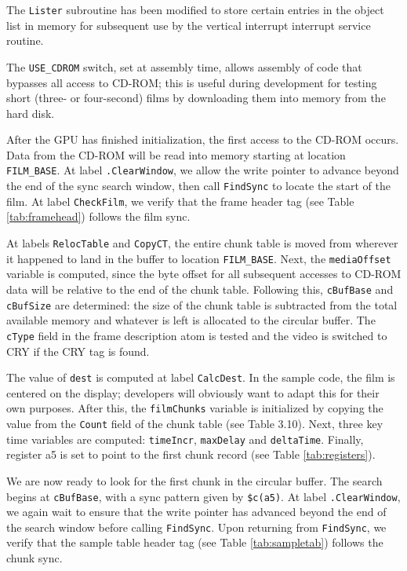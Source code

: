 \documentclass[12pt,letterpaper,twoside]{article}
\begin{document}
The \texttt{Lister} subroutine has been modified to store certain entries in the object list in memory for subsequent use by the vertical interrupt interrupt service routine.

The \texttt{USE\_CDROM} switch, set at assembly time, allows assembly of code that bypasses all access to CD-ROM; this is useful during development for testing short (three- or four-second) films by downloading them into memory from the hard disk.

After the GPU has finished initialization, the first access to the CD-ROM occurs. Data from the CD-ROM will be read into memory starting at location \texttt{FILM\_BASE}. At label \texttt{.ClearWindow}, we allow the write pointer to advance beyond the end of the sync search window, then call \texttt{FindSync} to locate the start of the film. At label \texttt{CheckFilm}, we verify that the frame header tag (see Table \ref{tab:framehead}) follows the film sync.

At labels \texttt{RelocTable} and \texttt{CopyCT}, the entire chunk table is moved from wherever it happened to land in the buffer to location \texttt{FILM\_BASE}. Next, the \texttt{mediaOffset} variable is computed, since the byte offset for all subsequent accesses to CD-ROM data will be relative to the end of the chunk table. Following this, \texttt{cBufBase} and \texttt{cBufSize} are determined: the size of the chunk table is subtracted from the total available memory and whatever is left is allocated to the circular buffer. The \texttt{cType} field in the frame description atom is tested and the video is switched to CRY if the CRY tag is found.

The value of \texttt{dest} is computed at label \texttt{CalcDest}. In the sample code, the film is centered on the display; developers will obviously want to adapt this for their own purposes. After this, the \texttt{filmChunks} variable is initialized by copying the value from the \texttt{Count} field of the chunk table (see Table 3.10). Next, three key time variables are computed: \texttt{timeIncr}, \texttt{maxDelay} and \texttt{deltaTime}. Finally, register a5 is set to point to the first chunk record (see Table \ref{tab:registers}).

We are now ready to look for the first chunk in the circular buffer. The search begins at \texttt{cBufBase}, with a sync pattern given by \texttt{\$c(a5)}. At label \texttt{.ClearWindow}, we again wait to ensure that the write pointer has advanced beyond the end of the search window before calling \texttt{FindSync}. Upon returning from \texttt{FindSync}, we verify that the sample table header tag (see Table \ref{tab:sampletab}) follows the chunk sync.
\end{document}
